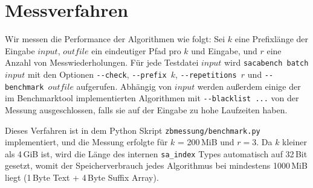 \section{Messverfahren}

Wir messen die Performance der Algorithmen wie folgt: Sei $k$ eine Prefixlänge der Eingabe $input$, $outfile$ ein eindeutiger Pfad pro $k$ und Eingabe, und $r$ eine Anzahl von Messwiederholungen. Für jede Testdatei $input$ wird \texttt{sacabench batch $input$} mit den Optionen \texttt{-{}-check}, \texttt{-{}-prefix $k$}, \texttt{-{}-repetitions $r$} und \texttt{-{}-benchmark $outfile$} aufgerufen. Abhängig von $input$ werden außerdem einige der im Benchmarktool implementierten Algorithmen mit \texttt{-{}-blacklist ...} von der Messung ausgeschlossen, falls sie auf der Eingabe zu hohe Laufzeiten haben.


Dieses Verfahren ist in dem Python Skript \texttt{zbmessung/benchmark.py} implementiert, und die Messung erfolgte für $k$ = 200\,MiB und $r = 3$. Da $k$ kleiner als 4\,GiB ist, wird die Länge des internen \texttt{sa\_index} Types automatisch auf 32\,Bit gesetzt, womit der Speicherverbrauch jedes Algorithmus bei mindestens 1000\,MiB liegt (1\,Byte Text + 4\,Byte Suffix Array).
